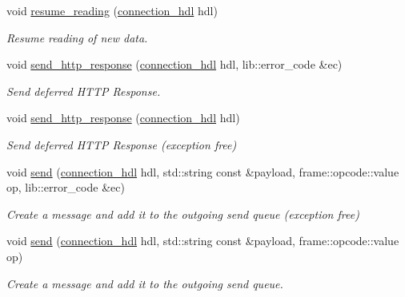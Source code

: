 \begin{DoxyCompactItemize}
\mbox{\label{classwebsocketpp_1_1endpoint_a4592d2270f56fce0f30a41cd17f77650}} 
void \mbox{\hyperlink{classwebsocketpp_1_1endpoint_a4592d2270f56fce0f30a41cd17f77650}{resume\+\_\+reading}} (\mbox{\hyperlink{namespacewebsocketpp_a6b3d26a10ee7229b84b776786332631d}{connection\+\_\+hdl}} hdl)
\begin{DoxyCompactList}\small\item\em Resume reading of new data. \end{DoxyCompactList}\item 
void \mbox{\hyperlink{classwebsocketpp_1_1endpoint_ae78b1414f7e0cf71c9eab0a29efab8a1}{send\+\_\+http\+\_\+response}} (\mbox{\hyperlink{namespacewebsocketpp_a6b3d26a10ee7229b84b776786332631d}{connection\+\_\+hdl}} hdl, lib\+::error\+\_\+code \&ec)
\begin{DoxyCompactList}\small\item\em Send deferred H\+T\+TP Response. \end{DoxyCompactList}\item 
void \mbox{\hyperlink{classwebsocketpp_1_1endpoint_af29ca34a6659beea0422a2f27718b9c2}{send\+\_\+http\+\_\+response}} (\mbox{\hyperlink{namespacewebsocketpp_a6b3d26a10ee7229b84b776786332631d}{connection\+\_\+hdl}} hdl)
\begin{DoxyCompactList}\small\item\em Send deferred H\+T\+TP Response (exception free) \end{DoxyCompactList}\item 
void \mbox{\hyperlink{classwebsocketpp_1_1endpoint_a5341f59de7ef1a565a2fd93daba212d5}{send}} (\mbox{\hyperlink{namespacewebsocketpp_a6b3d26a10ee7229b84b776786332631d}{connection\+\_\+hdl}} hdl, std\+::string const \&payload, frame\+::opcode\+::value op, lib\+::error\+\_\+code \&ec)
\begin{DoxyCompactList}\small\item\em Create a message and add it to the outgoing send queue (exception free) \end{DoxyCompactList}\item 
void \mbox{\hyperlink{classwebsocketpp_1_1endpoint_a9eb8f9fd7fbb7d8374eb02e100430bcf}{send}} (\mbox{\hyperlink{namespacewebsocketpp_a6b3d26a10ee7229b84b776786332631d}{connection\+\_\+hdl}} hdl, std\+::string const \&payload, frame\+::opcode\+::value op)
\begin{DoxyCompactList}\small\item\em Create a message and add it to the outgoing send queue. \end{DoxyCompactList}\item 

\end{DoxyCompactItemize}
